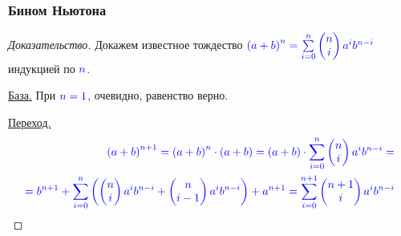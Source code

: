 \begin{frame}[t]
\frametitle{Бином Ньютона}

\begin{proof}[Доказательство]
    Докажем известное тождество $\color{blue} \left( a+b \right)^n = \sum\limits_{i=0}^{n} \begin{pmatrix} n \\ i \end{pmatrix} a^i b^{n-i} $ индукцией по $\color{blue}n$.

    \underline{База.} При $\color{blue} n=1$, очевидно, равенство верно.

     \underline{Переход.} 
     \begin{align*}
         \color{blue} \left( a+b \right)^{n+1} = \left( a+b \right) ^{n} \cdot \left( a+b \right) = \left( a+b \right) \cdot \sum_{i=0}^{n} \begin{pmatrix} n \\ i \end{pmatrix} a^i b^{n-i} = \\
         \color{blue} = b^{n+1} + \sum_{i=0}^{n} \left(\begin{pmatrix} n \\ i \end{pmatrix} a^{i}b^{n-i} + \begin{pmatrix} n \\ i-1 \end{pmatrix} a^{i}b^{n-i} \right)  + a^{n+1} = \sum_{i=0}^{n+1} \begin{pmatrix} n+1 \\ i \end{pmatrix} a^{i}b^{n-i}
     \end{align*}
\end{proof}
\end{frame}

